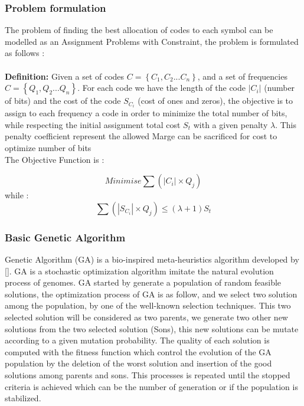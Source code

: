 \documentclass[preprint,12pt]{elsarticle}
\begin{document}
\subsubsection{Problem formulation}
The problem of finding the best allocation of codes to each symbol can be   modelled as an Assignment Problems with Constraint, the problem is formulated as follows :\\\\
\textbf{Definition:} Given a set of codes $C=\left\{C_{1},C_{2}...C_{n}\right\}$, and a set of frequencies $C=\left\{Q_{1},Q_{2}...Q_{n}\right\}$. For each code we have the length of the code $|C_{i}|$ (number of bits) and the cost of the code $S_{C_{i}}$ (cost of ones and zeros), the objective is to assign to each frequency a code in order to minimize the total number of bits, while respecting the initial assignment total cost $S_{t}$ with a given penalty $\lambda$. This penalty coefficient represent the allowed Marge can be sacrificed for cost to optimize number of bits    
\\
The Objective Function is : 

\begin{equation}
Minimise \sum (|C_{i}| \times Q_{j}) 
\end{equation}
while :
\begin{equation}
\sum (|S_{C_{i}}| \times Q_{j}) \leqslant (\lambda+1) S_{t} 
\end{equation}

\subsubsection{Basic Genetic Algorithm}
Genetic Algorithm (GA) is a bio-inspired meta-heuristics algorithm developed by []. GA is a stochastic optimization algorithm imitate the natural evolution process of genomes. GA started by generate a population of random feasible solutions, the optimization process of GA is as follow, and we select two solution among the population, by one of the well-known selection techniques. This two selected solution will be considered as two parents, we generate two other new solutions from the two selected solution (Sons), this new solutions can be mutate according to a given mutation probability. The quality of each solution is computed with the fitness function which control the evolution of the GA population by the deletion of the worst solution and insertion of the good solutions among   parents and sons. This processes is repeated until the stopped criteria is achieved which can be the number of generation or if the population is stabilized.
\end{document}
